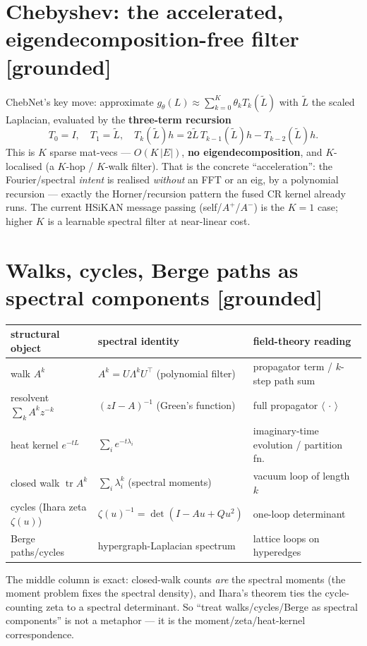 \documentclass[11pt]{article}
\newcommand{\grd}{\textcolor{green!50!black}{\textbf{[grounded]}}}
\begin{document}
\section{Chebyshev: the accelerated, eigendecomposition-free filter \grd}
ChebNet's key move: approximate $g_\theta(L)\approx\sum_{k=0}^{K}\theta_k T_k(\tilde L)$ with $\tilde L$ the
scaled Laplacian, evaluated by the \textbf{three-term recursion}
\[
  T_0=I,\quad T_1=\tilde L,\quad T_k(\tilde L)h = 2\tilde L\,T_{k-1}(\tilde L)h - T_{k-2}(\tilde L)h .
\]
This is $K$ sparse mat-vecs --- $O(K\,|E|)$, \textbf{no eigendecomposition}, and $K$-localised (a $K$-hop /
$K$-walk filter). That is the concrete ``acceleration'': the Fourier/spectral \emph{intent} is realised
\emph{without} an FFT or an eig, by a polynomial recursion --- exactly the Horner/recursion pattern the fused
CR kernel already runs. The current HSiKAN message passing (self/$A^+$/$A^-$) is the $K{=}1$ case; higher $K$
is a learnable spectral filter at near-linear cost.

\section{Walks, cycles, Berge paths as spectral components \grd}
\begin{center}\small
\begin{tabular}{lll}
\toprule
structural object & spectral identity & field-theory reading \\
\midrule
walk $A^k$ & $A^k=U\Lambda^k U^\top$ (polynomial filter) & propagator term / $k$-step path sum \\
resolvent $\sum_k A^k z^{-k}$ & $(zI-A)^{-1}$ (Green's function) & full propagator $\langle\,\cdot\,\rangle$ \\
heat kernel $e^{-tL}$ & $\sum_i e^{-t\lambda_i}$ & imaginary-time evolution / partition fn. \\
closed walk $\operatorname{tr}A^k$ & $\sum_i\lambda_i^k$ (spectral moments) & vacuum loop of length $k$ \\
cycles (Ihara zeta $\zeta(u)$) & $\zeta(u)^{-1}=\det(I-Au+Qu^2)$ & one-loop determinant \\
Berge paths/cycles & hypergraph-Laplacian spectrum & lattice loops on hyperedges \\
\bottomrule
\end{tabular}
\end{center}
\noindent The middle column is exact: closed-walk counts \emph{are} the spectral moments (the moment problem fixes
the spectral density), and Ihara's theorem ties the cycle-counting zeta to a spectral determinant. So
``treat walks/cycles/Berge as spectral components'' is not a metaphor --- it is the moment/zeta/heat-kernel
correspondence.
\end{document}
